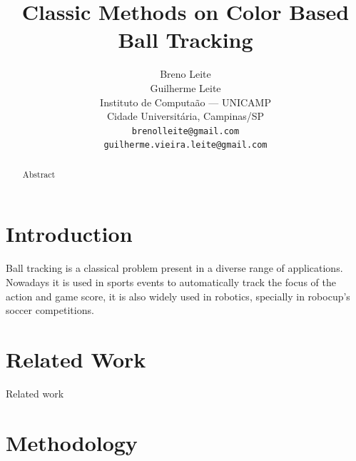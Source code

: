 \documentclass[10pt,twocolumn,letterpaper]{article}
\begin{document}
\title{Classic Methods on Color Based Ball Tracking}

\author{Breno Leite\\ Guilherme Leite\\
Instituto de Computa\cc\~ao --- UNICAMP\\
Cidade Universit\'aria, Campinas/SP\\
{\tt\small brenolleite@gmail.com\\ \tt\small guilherme.vieira.leite@gmail.com}
}

\maketitle

\begin{abstract}
  Abstract
\end{abstract}

\section{Introduction}

  Ball tracking is a classical problem present in a diverse range of
  applications. Nowadays it is used in sports events to automatically track the
  focus of the action and game score, it is also widely used in robotics,
  specially in robocup’s soccer competitions.


\section{Related Work}

  Related work

\section{Methodology}
\end{document}
